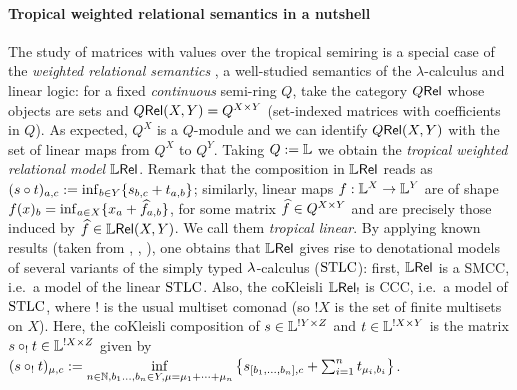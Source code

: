 \documentclass[submission,%
]{eptcs}
\begin{document}
\paragraph{Tropical weighted relational semantics in a nutshell}

The study of matrices with values over the tropical semiring is a special case of the
\emph{weighted relational semantics} \cite{Manzo2013}, a well-studied semantics of the $\lambda$-calculus and linear logic:
for a fixed \emph{continuous} semi-ring $Q$, take the category $Q \mathsf{Rel}$ whose objects are sets and ${Q \mathsf{Rel}}(X,Y)=Q^{X\times Y}$ (set-indexed matrices with coefficients in $Q$). %
As expected, $Q^X$ is a $Q$-module and we can identify ${Q \mathsf{Rel}}(X,Y)$ with the set of linear maps from $Q^X$ to $Q^Y$.
Taking $Q:=\mathbb{L}$ we obtain the \emph{tropical weighted relational model} $\mathbb{L} \mathsf{Rel}$.
Remark that the composition in $\mathbb{L} \mathsf{Rel}$ %
reads as \ $(s\circ t)_{a,c}:=\inf_{b\in Y}\{s_{b,c}+t_{a,b}\}$;
similarly, linear maps $f:\mathbb{L}^X\to \mathbb{L}^Y$ are of shape $f(x)_b=\inf_{a\in X} \{x_a+\widehat{f}_{a,b}\}$, for some matrix $\widehat{f}\in Q^{X\times Y}$ and are precisely those induced by $\widehat{f}\in{\mathbb{L}\mathsf{Rel}}(X,Y)$. We call them \emph{tropical linear}.
By applying known results (taken from \cite{Manzo2013}, \cite{Laird2020}, \cite{LemayCALCO2021}), one obtains that $\mathbb{L} \mathsf{Rel}$ gives rise to denotational models of several variants of the simply typed $\lambda$-calculus ($\mathrm{STLC}$):
first, $\mathbb{L} \mathsf{Rel}$ is a SMCC, i.e.\ a model of the linear $\mathrm{STLC}$.
Also, the coKleisli $\mathbb{L} \mathsf{Rel}_!$ is CCC, i.e.\ a model of $\mathrm{STLC}$, where $!$ is the usual multiset comonad (so $!X$ is the set of finite multisets on $X$).
Here, the coKleisli composition of $s\in\mathbb{L}^{!Y\times Z}$ and $t\in\mathbb{L}^{!X\times Y}$ is the matrix $s\circ_! t\in\mathbb{L}^{!X\times Z}$ given by
$(s\circ_! t)_{\mu,c}:=
 \inf\limits_{n\in\mathbb{N}, b_1\dots,b_n\in Y, \mu = \mu_1+\cdots +\mu_n}
 \left\{s_{[b_1,\dots,b_n],c} + \sum_{i=1}^n t_{\mu_i,b_i}\right\}$.
\end{document}
